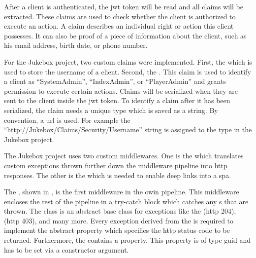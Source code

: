 \newpage



After a client is authenticated, the \gls{jwt} token will be read and all claims will be extracted. These claims are used to check whether the client is authorized to execute an action. A claim describes an individual right or action this client possesses. It can also be proof of a piece of information about the client, such as his email address, birth date, or phone number.

For the Jukebox project, two custom claims were implemented. First, the  which is used to store the username of a client. Second, the . This claim is used to identify a client as \enquote{SystemAdmin}, \enquote{IndexAdmin}, or \enquote{PlayerAdmin} and grants permission to execute certain actions. Claims will be serialized when they are sent to the client inside the \gls{jwt} token. To identify a claim after it has been serialized, the claim needs a unique type which is saved as a string. By convention, a \gls{url} is used. For example the \enquote{http://Jukebox/Claims/Security/Username} string is assigned to the  type in the Jukebox project. \cite{claimsBasedAuth}


The Jukebox project uses two custom middlewares. One is the  which translates custom exceptions thrown further down the middleware pipeline into \gls{http} responses. The other is the  which is needed to enable deep links into a \gls{spa}.


The , shown in , is the first middleware in the \gls{owin} pipeline. This middleware encloses the rest of the pipeline in a try-catch block which catches any s that are thrown. The  class is an abstract base class for exceptions like the  (\gls{http} 204),  (\gls{http} 403), and many more. Every exception derived from the  is required to implement the abstract  property which specifies the \gls{http} status code to be returned. Furthermore, the  contains a  property. This property is of type \gls{guid} and has to be set via a constructor argument.

